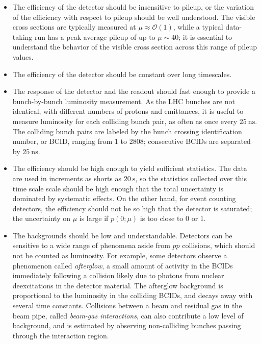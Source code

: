 \begin{itemize}
	\item The efficiency of the detector should be insensitive to pileup, or the variation of the efficiency with respect to pileup should be well understood. The visible cross sections are typically measured at $\mu\approx \mathcal{O}(1)$, while a typical data-taking run has a peak average pileup of up to $\mu\sim40$; it is essential to understand the behavior of the visible cross section across this range of pileup values.

	\item The efficiency of the detector should be constant over long timescales.

	\item The response of the detector and the readout should fast enough to provide a bunch-by-bunch luminosity measurement. As the LHC bunches are not identical, with different numbers of protons and emittances, it is useful to measure luminosity for each colliding bunch pair, as often as once every $\SI{25}{\nano\second}$. The colliding bunch pairs are labeled by the bunch crossing identification number, or BCID, ranging from 1 to 2808; consecutive BCIDs are separated by $\SI{25}{\nano\second}$.

	\item The efficiency should be high enough to yield sufficient statistics. The data are used in increments as shorts as $\SI{20}{\second}$, so the statistics collected over this time scale scale should be high enough that the total uncertainty is dominated by systematic effects. On the other hand, for event counting detectors, the efficiency should not be so high that the detector is saturated; the uncertainty on $\mu$ is large if $p(0;\mu)$ is too close to 0 or 1. 

	\item The backgrounds should be low and understandable. Detectors can be sensitive to a wide range of phenomena aside from $pp$ collisions, which should not be counted as luminosity. For example, some detectors observe a phenomenon called \emph{afterglow}, a small amount of activity in the BCIDs immediately following a collision likely due to photons from nuclear deexcitations in the detector material. The afterglow background is proportional to the luminosity in the colliding BCIDs, and decays away with several time constants. Collisions between a beam and residual gas in the beam pipe, called \emph{beam-gas interactions}, can also contribute a low level of background, and is estimated by observing non-colliding bunches passing through the interaction region.

\end{itemize}

